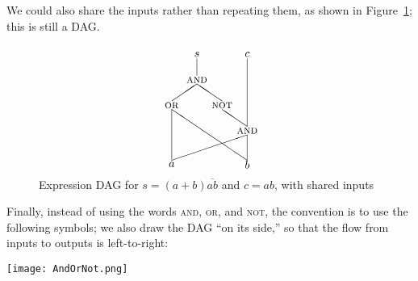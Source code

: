 We could also share the inputs rather than repeating them, as shown in Figure~\ref{fig:exprdag2}; this is still a DAG.
\begin{figure}
\[ \setlength{\unitlength}{0.75pt}
\begin{picture}(110,140)
\put(10,0){\makebox(0,0){$a$}}
\put(100,0){\makebox(0,0){$b$}}
\put(10,70){\makebox(0,0){\textsc{or}}}
\put(10,5){\line(0,1){60}}
\put(100,5){\line(-3,2){90}}
\put(100,40){\makebox(0,0){\textsc{and}}}
\put(10,5){\line(3,1){90}}
\put(100,5){\line(0,1){30}}
\put(70,70){\makebox(0,0){\textsc{not}}}
\put(100,45){\line(-3,2){30}}
\put(40,100){\makebox(0,0){\textsc{and}}}
\put(10,75){\line(3,2){30}}
\put(70,75){\line(-3,2){30}}
\put(40,130){\makebox(0,0){$s$}}
\put(40,105){\line(0,1){20}}
\put(100,130){\makebox(0,0){$c$}}
\put(100,45){\line(0,1){80}}
\end{picture} \]
\caption{Expression DAG for $s=(a+b)\overline{ab}$ and $c=ab$, with shared inputs}
\label{fig:exprdag2}
\end{figure}

Finally, instead of using the words \textsc{and}, \textsc{or}, and \textsc{not}, the convention is to use the following symbols; we also draw the DAG ``on its side,'' so that the flow from inputs to outputs is left-to-right:
\begin{center}
\texttt{[image: AndOrNot.png]}
\end{center}

